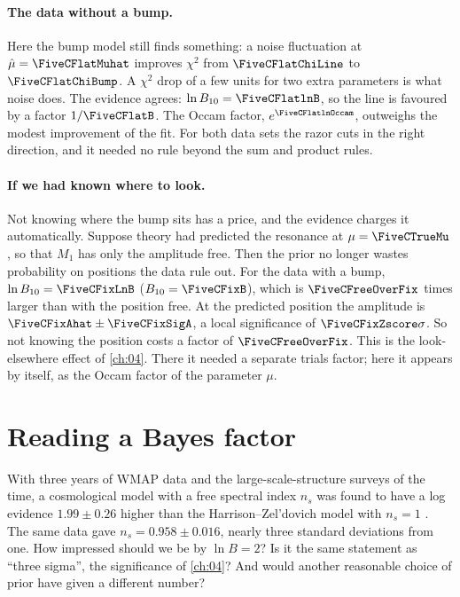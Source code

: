 \paragraph{The data without a bump.}
Here the bump model still finds something: a noise fluctuation at
$\hat\mu=\FiveCFlatMuhat$ improves $\chi^2$ from $\FiveCFlatChiLine$ to
$\FiveCFlatChiBump$. A $\chi^2$ drop of a few units for two extra parameters is what
noise does. The evidence agrees: $\ln B_{10}=\FiveCFlatlnB$, so the line is favoured by
a factor $1/\FiveCFlatB$. The Occam factor, $e^{\FiveCFlatlnOccam}$, outweighs the
modest improvement of the fit. For both data sets the razor cuts in the right
direction, and it needed no rule beyond the sum and product rules.

\paragraph{If we had known where to look.}
Not knowing where the bump sits has a price, and the evidence charges it
automatically. Suppose theory had predicted the resonance at $\mu=\FiveCTrueMu$, so
that $M_1$ has only the amplitude free. Then the prior no longer wastes probability on
positions the data rule out. For the data with a bump, $\ln B_{10}=\FiveCFixLnB$
($B_{10}=\FiveCFixB$), which is $\FiveCFreeOverFix$ times larger than with the position
free. At the predicted position the amplitude is $\FiveCFixAhat\pm\FiveCFixSigA$, a
local significance of $\FiveCFixZscore\sigma$. So not knowing the position costs a
factor of $\FiveCFreeOverFix$. This is the look-elsewhere effect of \cref{ch:04}. There it
needed a separate trials factor; here it appears by itself, as the Occam factor of the
parameter $\mu$.
\section{Reading a Bayes factor}
\label{5c:sec:reading}

With three years of WMAP data and the large-scale-structure surveys of the time, a
cosmological model with a free spectral index $n_s$ was found to have a log evidence
$1.99\pm0.26$ higher than the Harrison--Zel'dovich model with $n_s=1$
. The same data gave $n_s=0.958\pm0.016$, nearly three
standard deviations from one. How impressed should we be by $\ln B=2$? Is it the same
statement as ``three sigma'', the significance of \cref{ch:04}? And would another
reasonable choice of prior have given a different number?

